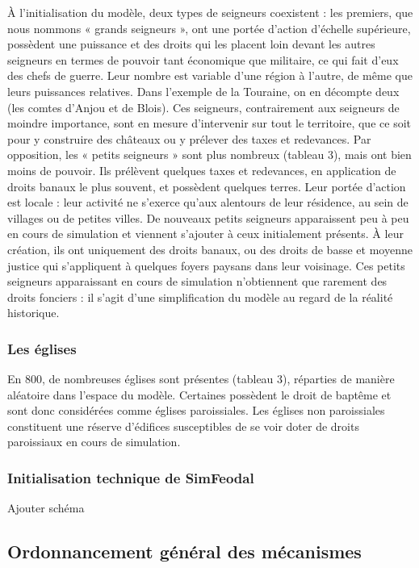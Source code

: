 À l'initialisation du modèle, deux types de seigneurs coexistent : les premiers, que nous nommons « grands seigneurs », ont une portée d'action d'échelle supérieure, possèdent une puissance et des droits qui les placent loin devant les autres seigneurs en termes de pouvoir tant économique que militaire, ce qui fait d'eux des chefs de guerre.
Leur nombre est variable d'une région à l'autre, de même que leurs puissances relatives.
Dans l'exemple de la Touraine, on en décompte deux (les comtes d'Anjou et de Blois).
Ces seigneurs, contrairement aux seigneurs de moindre importance, sont en mesure d'intervenir sur tout le territoire, que ce soit pour y construire des châteaux ou y prélever des taxes et redevances.
Par opposition, les « petits seigneurs » sont plus nombreux (tableau 3), mais ont bien moins de pouvoir.
Ils prélèvent quelques taxes et redevances, en application de droits banaux le plus souvent, et possèdent quelques terres.
Leur portée d'action est locale : leur activité ne s'exerce qu'aux alentours de leur résidence, au sein de villages ou de petites villes.
De nouveaux petits seigneurs apparaissent peu à peu en cours de simulation et viennent s'ajouter à ceux initialement présents.
À leur création, ils ont uniquement des droits banaux, ou des droits de basse et moyenne justice qui s'appliquent à quelques foyers paysans dans leur voisinage.
Ces petits seigneurs apparaissant en cours de simulation n'obtiennent que rarement des droits fonciers : il s'agit d'une simplification du modèle au regard de la réalité historique.

\subsubsection{Les églises}

En 800, de nombreuses églises sont présentes (tableau 3), réparties de manière aléatoire dans l'espace du modèle. 
Certaines possèdent le droit de baptême et sont donc considérées comme églises paroissiales.
Les églises non paroissiales constituent une réserve d'édifices susceptibles de se voir doter de droits paroissiaux en cours de simulation.

\subsubsection{Initialisation technique de SimFeodal}

Ajouter schéma

\subsection{Ordonnancement général des mécanismes}

